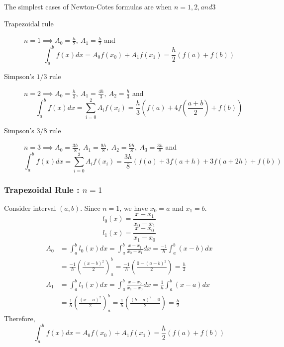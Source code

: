 	The simplest cases of Newton-Cotes formulas are when $n=1,2, and 3$
\begin{description}
	\item[Trapezoidal rule] $n = 1 \implies A_0 = \frac{h}{2},\ A_1 = \frac{h}{2}$ and
		\[ \int_a^b f(x) dx = A_0f(x_0) + A_1f(x_1) = \frac{h}{2} (f(a) + f(b)) \]
	\item[Simpson's $1/3$ rule] $n = 2 \implies A_0 = \frac{h}{3},\ A_1 = \frac{4h}{3},\ A_2 = \frac{h}{3}$ and 
		\[ \int_a^b f(x) dx = \sum_{i=0}^2 A_if(x_i) = \frac{h}{3} \left(f(a) + 4f\left(\frac{a+b}{2}\right) +  f(b)\right) \]
	\item[Simpson's $3/8$ rule] $n = 3 \implies A_0 = \frac{3h}{8},\ A_1 = \frac{9h}{8},\ A_2 = \frac{9h}{8},\ A_3 = \frac{3h}{8}$ and
		\[ \int_a^b f(x) dx = \sum_{i=0}^3 A_if(x_i) = \frac{3h}{8} (f(a) + 3f(a+h) + 3f(a+2h) + f(b)) \]
\end{description}
\subsubsection{Trapezoidal Rule : $n = 1$}
	Consider interval $(a,b)$. Since $n=1$, we have $x_0 = a$ and $x_1 = b$.
	\[ l_0(x) = \frac{x-x_1}{x_0-x_1} \]
	\[ l_1(x) = \frac{x-x_0}{x_1-x_0} \]
	\begin{align*}
		A_0 & = \int_a^b l_0(x) dx = \int_a^b \frac{x-x_1}{x_0-x_1} dx = \frac{-1}{h} \int_a^b (x-b)dx \\
		& = \frac{-1}{h} \left( \frac{(x-b)^2}{2} \right)_a^b = \frac{-1}{h} \left( \frac{0-(a-b)^2}{2} \right) = \frac{h}{2} \\
		A_1 & = \int_a^b l_1(x) dx = \int_a^b \frac{x-x_0}{x_1-x_0} dx = \frac{1}{h} \int_a^b (x-a)dx \\
		& = \frac{1}{h} \left( \frac{(x-a)^2}{2} \right)_a^b = \frac{1}{h} \left( \frac{(b-a)^2-0}{2} \right) = \frac{h}{2}
	\end{align*}
	Therefore,
	\[ \int_a^b f(x) dx = A_0f(x_0) + A_1f(x_1) = \frac{h}{2} (f(a) + f(b)) \]
